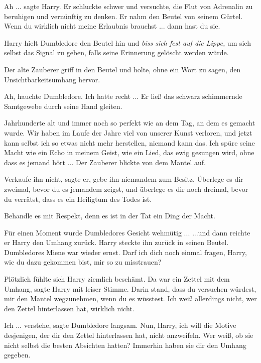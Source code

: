 \glqq{}Ah ...\grqq{} sagte Harry. Er schluckte schwer und versuchte, die Flut von
Adrenalin zu beruhigen und vernünftig zu denken. Er nahm den Beutel von seinem
Gürtel. \glqq{}Wenn du wirklich nicht meine Erlaubnis brauchst ... dann hast du
sie.\grqq{}

Harry hielt Dumbledore den Beutel hin und \emph{biss sich fest auf die Lippe,}
um sich selbst das Signal zu geben, falls seine Erinnerung gelöscht werden
würde.

Der alte Zauberer griff in den Beutel und holte, ohne ein Wort zu sagen, den
Unsichtbarkeitsumhang hervor.

\glqq{}Ah\grqq{}, hauchte Dumbledore. \glqq{}Ich hatte recht ...\grqq{} Er ließ das
schwarz schimmernde Samtgewebe durch seine Hand gleiten.

\glqq{}Jahrhunderte alt und immer noch so perfekt wie an dem Tag, an dem es
gemacht wurde. Wir haben im Laufe der Jahre viel von unserer Kunst verloren, und
jetzt kann selbst ich so etwas nicht mehr herstellen, niemand kann das. Ich
spüre seine Macht wie ein Echo in meinem Geist, wie ein Lied, das ewig gesungen
wird, ohne dass es jemand hört ...\grqq{} Der Zauberer blickte von dem Mantel
auf.

\glqq{}Verkaufe ihn nicht\grqq{}, sagte er, \glqq{}gebe ihn niemandem zum Besitz.
Überlege es dir zweimal, bevor du es jemandem zeigst, und überlege es dir noch
dreimal, bevor du verrätst, dass es ein Heiligtum des Todes ist.

Behandle es mit Respekt, denn es ist in der Tat ein Ding der Macht.\grqq{}

Für einen Moment wurde Dumbledores Gesicht wehmütig ... ...und dann reichte er
Harry den Umhang zurück. Harry steckte ihn zurück in seinen Beutel. Dumbledores
Miene war wieder ernst. \glqq{}Darf ich dich noch einmal fragen, Harry, wie du
dazu gekommen bist, mir so zu misstrauen?\grqq{}

Plötzlich fühlte sich Harry ziemlich beschämt. \glqq{}Da war ein Zettel mit dem
Umhang\grqq{}, sagte Harry mit leiser Stimme. \glqq{}Darin stand, dass du
versuchen würdest, mir den Mantel wegzunehmen, wenn du es wüsstest. Ich weiß
allerdings nicht, wer den Zettel hinterlassen hat, wirklich nicht.\grqq{}

\glqq{}Ich ... verstehe\grqq{}, sagte Dumbledore langsam. \glqq{}Nun, Harry, ich
will die Motive desjenigen, der dir den Zettel hinterlassen hat, nicht
anzweifeln. Wer weiß, ob sie nicht selbst die besten Absichten hatten? Immerhin
haben sie dir den Umhang gegeben.\grqq{}

